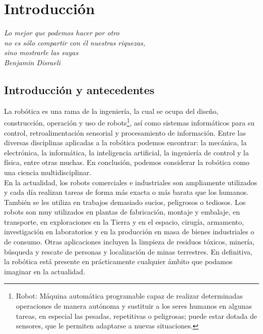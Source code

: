 

\chapter{Introducción}
\label{chap:introducción}

\emph{Lo mejor que podemos hacer por otro\\ no es sólo compartir con él nuestras riquezas,\\ sino mostrarle las suyas\\ Benjamin Disraeli}\\


\section{Introducción y antecedentes}
\label{sec:introduccion_y_antecedentes}

La robótica es una rama de la ingeniería, la cual se ocupa del diseño, construcción, operación y uso de robots\footnote{Robot: Máquina automática programable capaz de realizar determinadas operaciones de manera autónoma y sustituir a los seres humanos en algunas tareas, en especial las pesadas, repetitivas o peligrosas; puede estar dotada de sensores, que le permiten adaptarse a nuevas situaciones.}, así como sistemas informáticos para su control, retroalimentación sensorial y procesamiento de información. Entre las diversas disciplinas aplicadas a la robótica podemos encontrar: la mecánica, la electrónica, la informática, la inteligencia artificial, la ingeniería de control y la física, entre otras muchas. En conclusión, podemos considerar la robótica como una ciencia multidisciplinar.\\

En la actualidad, los robots comerciales e industriales son ampliamente utilizados y cada día realizan tareas de forma más exacta o más barata que los humanos. También se les utiliza en trabajos demasiado sucios, peligrosos o tediosos. Los robots son muy utilizados en plantas de fabricación, montaje y embalaje, en transporte, en exploraciones en la Tierra y en el espacio, cirugía, armamento, investigación en laboratorios y en la producción en masa de bienes industriales o de consumo. Otras aplicaciones incluyen la limpieza de residuos tóxicos, minería, búsqueda y rescate de personas y localización de minas terrestres. En definitiva, la robótica está presente en prácticamente cualquier ámbito que podamos imaginar en la actualidad.\\

